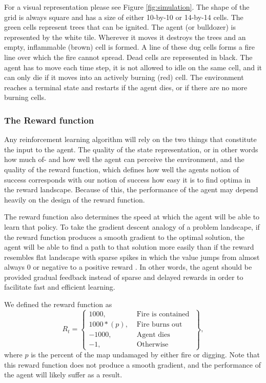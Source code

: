 For a visual representation please see Figure \ref{fig:simulation}. The shape of the grid is always square and has a size of either 10-by-10 or 14-by-14 cells. The green cells represent trees that can be ignited. The agent (or bulldozer) is represented by the white tile. Wherever it moves it destroys the trees and an empty, inflammable (brown) cell is formed. A line of these dug cells forms a fire line over which the fire cannot spread. Dead cells are represented in black. The agent has to move each time step, it is not allowed to idle on the same cell, and it can only die if it moves into an actively burning (red) cell. The environment reaches a terminal state and restarts if the agent dies, or if there are no more burning cells.

\subsubsection{The Reward function}\label{sec:reward_function}
Any reinforcement learning algorithm will rely on the two things that constitute the input to the agent. The quality of the state representation, or in other words how much of- and how well the agent can perceive the environment, and the quality of the reward function, which defines how well the agents notion of success corresponds with our notion of success how easy it is to find optima in the reward landscape. Because of this, the performance of the agent may depend heavily on the design of the reward function.

The reward function also determines the speed at which the agent will be able to learn that policy. To take the gradient descent analogy of a problem landscape, if the reward function produces a smooth gradient to the optimal solution, the agent will be able to find a path to that solution more easily than if the reward resembles flat landscape with sparse spikes in which the value jumps from almost always 0 or negative to a positive reward \citep{sutton_barto_2018}. In other words, the agent should be provided gradual feedback instead of sparse and delayed rewards in order to facilitate fast and efficient learning. 

We defined the reward function as
\begin{equation}\label{eq:reward_function}
    R_t = \left\{\begin{array}{lr}
        1000, & \text{ Fire is contained }\\
        1000 * (p), & \text{ Fire burns out }\\
        -1000, & \text{ Agent dies }\\
        -1, & \text{ Otherwise }

        \end{array}\right\},
\end{equation}
where $p$ is the percent of the map undamaged by either fire or digging. Note that this reward function does not produce a smooth gradient, and the performance of the agent will likely suffer as a result.

